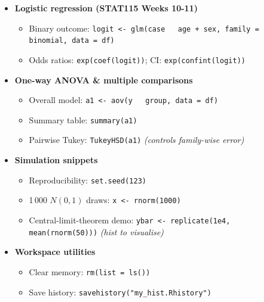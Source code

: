 \documentclass[12pt]{book}
\begin{document}
\begin{itemize}
\item \textbf{Logistic regression (STAT115 Weeks 10-11)}
  \begin{itemize}
    \item Binary outcome: \texttt{logit <- glm(case ~ age + sex,\; family = binomial,\; data = df)}
    \item Odds ratios: \texttt{exp(coef(logit))}; CI: \texttt{exp(confint(logit))}
  \end{itemize}

\item \textbf{One-way ANOVA \& multiple comparisons}
  \begin{itemize}
    \item Overall model: \texttt{a1 <- aov(y ~ group, data = df)}
    \item Summary table: \texttt{summary(a1)}
    \item Pairwise Tukey: \texttt{TukeyHSD(a1)}  \hfill\emph{(controls family-wise error)}
  \end{itemize}

\item \textbf{Simulation snippets}
  \begin{itemize}
    \item Reproducibility: \texttt{set.seed(123)}
    \item 1\,000 $N(0,1)$ draws: \texttt{x <- rnorm(1000)}
    \item Central-limit-theorem demo:  
          \texttt{ybar <- replicate(1e4, mean(rnorm(50)))} \hfill\emph{(hist to visualise)}
  \end{itemize}

\item \textbf{Workspace utilities}
  \begin{itemize}
    \item Clear memory: \texttt{rm(list = ls())}
    \item Save history: \texttt{savehistory("my\_hist.Rhistory")}
  \end{itemize}

\end{itemize}


\end{document}
